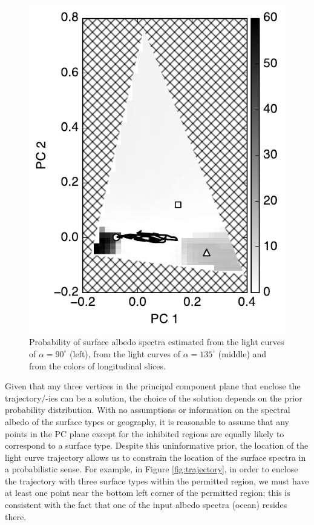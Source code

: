 \documentclass[iop,numberedappendix,apj]{emulateapj}
\begin{document}
\begin{figure}[tbh!]
\begin{minipage}{0.33\hsize}
\begin{center}
\includegraphics[width=\hsize]{IGBP_lon_noreg_allowedregion_gray.pdf}
    \end{center}
     \end{minipage}
    \caption{Probability of surface albedo spectra estimated from the light curves of $\alpha = 90^{\circ }$ (left), from the light curves of $\alpha = 135^{\circ }$ (middle) and from the colors of longitudinal slices. }
\label{fig:PCplane}
\end{figure}


Given that any three vertices in the principal component plane that enclose the trajectory/-ies can be a solution, the choice of the solution depends on the prior probability distribution.  
With no assumptions or information on the spectral albedo of the surface types or geography, it is reasonable to assume that any points in the PC plane except for the inhibited regions are equally likely to correspond to a surface type. 
Despite this uninformative prior, the location of the light curve trajectory allows us to constrain the location of the surface spectra in a probabilistic sense. 
For example, in Figure \ref{fig:trajectory}, in order to enclose the trajectory with three surface types within the permitted region, we must have at least one point near the bottom left corner of the permitted region; this is consistent with the fact that one of the input albedo spectra (ocean) resides there. 
\end{document}
